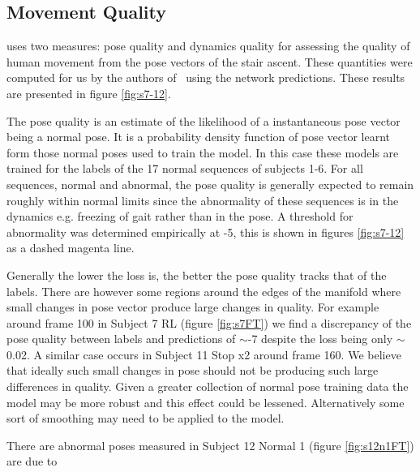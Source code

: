 \documentclass[11pt]{article} %
\begin{document}
\subsection{Movement Quality}

\cite{Paiement} uses two measures: pose quality and dynamics quality for assessing the quality of human movement from the pose vectors of the stair ascent. These quantities were computed for us by the authors of~\cite{Paiement} using the network predictions. These results are presented in figure \ref{fig:s7-12}. 

The pose quality is an estimate of the likelihood of a instantaneous pose vector being a normal pose. It is a probability density function of pose vector learnt form those normal poses used to train the model. In this case these models are trained for the labels of the 17 normal sequences of subjects 1-6. For all sequences, normal and abnormal, the pose quality is generally expected to remain roughly within normal limits since the abnormality of these sequences is in the dynamics e.g. freezing of gait rather than in the pose. A threshold for abnormality was determined empirically at -5, this is shown in figures \ref{fig:s7-12} as a dashed magenta line.

Generally the lower the loss is, the better the pose quality tracks that of the labels. There are however some regions around the edges of the manifold where small changes in pose vector produce large changes in quality. For example around frame 100 in Subject 7 RL (figure \ref{fig:s7FT}) we find a discrepancy of the pose quality between labels and predictions of $\sim$-7 despite the loss being only $\sim$0.02. A similar case occurs in Subject 11 Stop x2 around frame 160. We believe that ideally such small changes in pose should not be producing such large differences in quality. Given a greater collection of normal pose training data the model may be more robust and this effect could be lessened. Alternatively some sort of smoothing may need to be applied to the model. 

There are abnormal poses measured in Subject 12 Normal 1 (figure \ref{fig:s12n1FT}) are due to 
\end{document}
